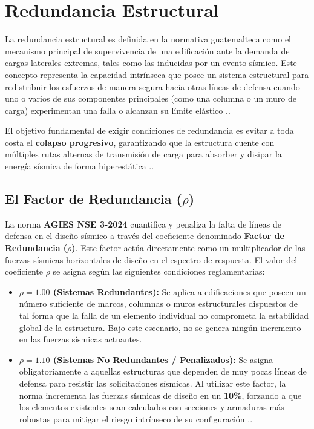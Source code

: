 \documentclass[14pt,letterpaper]{extarticle}
\begin{document}
	
	
	
	\section{Redundancia Estructural}
	
	La redundancia estructural es definida en la normativa guatemalteca como el mecanismo principal de supervivencia de una edificación ante la demanda de cargas laterales extremas, tales como las inducidas por un evento sísmico. Este concepto representa la capacidad intrínseca que posee un sistema estructural para redistribuir los esfuerzos de manera segura hacia otras líneas de defensa cuando uno o varios de sus componentes principales (como una columna o un muro de carga) experimentan una falla o alcanzan su límite elástico .. 
	
	El objetivo fundamental de exigir condiciones de redundancia es evitar a toda costa el \textbf{colapso progresivo}, garantizando que la estructura cuente con múltiples rutas alternas de transmisión de carga para absorber y disipar la energía sísmica de forma hiperestática ..
	
	\subsection{El Factor de Redundancia ($\rho$)}
	La norma \textbf{AGIES NSE 3-2024} cuantifica y penaliza la falta de líneas de defensa en el diseño sísmico a través del coeficiente denominado \textbf{Factor de Redundancia ($\rho$)}. Este factor actúa directamente como un multiplicador de las fuerzas sísmicas horizontales de diseño en el espectro de respuesta. El valor del coeficiente $\rho$ se asigna según las siguientes condiciones reglamentarias:
	
	\begin{itemize}
		\item \textbf{$\rho = 1.00$ (Sistemas Redundantes):} Se aplica a edificaciones que poseen un número suficiente de marcos, columnas o muros estructurales dispuestos de tal forma que la falla de un elemento individual no comprometa la estabilidad global de la estructura. Bajo este escenario, no se genera ningún incremento en las fuerzas sísmicas actuantes.
		\item \textbf{$\rho = 1.10$ (Sistemas No Redundantes / Penalizados):} Se asigna obligatoriamente a aquellas estructuras que dependen de muy pocas líneas de defensa para resistir las solicitaciones sísmicas. Al utilizar este factor, la norma incrementa las fuerzas sísmicas de diseño en un \textbf{10\%}, forzando a que los elementos existentes sean calculados con secciones y armaduras más robustas para mitigar el riesgo intrínseco de su configuración ..
	\end{itemize}
	
\end{document}
